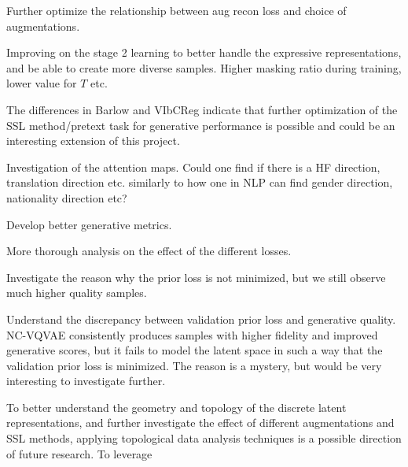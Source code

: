 \documentclass[../../thesis.tex]{subfiles}
\begin{document}
Further optimize the relationship between aug recon loss and choice of augmentations.\newline

Improving on the stage 2 learning to better handle the expressive representations, and be able to create more diverse samples. Higher masking ratio during training, lower value for $T$ etc.\newline

The differences in Barlow and VIbCReg indicate that further optimization of the SSL method/pretext task for generative performance is possible and could be an interesting extension of this project. \newline

Investigation of the attention maps. Could one find if there is a HF direction, translation direction etc. similarly to how one in NLP can find gender direction, nationality direction etc?\newline

Develop better generative metrics. \newline

More thorough analysis on the effect of the different losses. \newline

Investigate the reason why the prior loss is not minimized, but we still observe much higher quality samples.\newline

Understand the discrepancy between validation prior loss and generative quality. NC-VQVAE consistently produces samples with higher fidelity and improved generative scores, but it fails to model the latent space in such a way that the validation prior loss is minimized. The reason is a mystery, but would be very interesting to investigate further.\newline


To better understand the geometry and topology of the discrete latent representations, and further investigate the effect of different augmentations and SSL methods, applying topological data analysis techniques is a possible direction of future research. 
To leverage 
\end{document}
